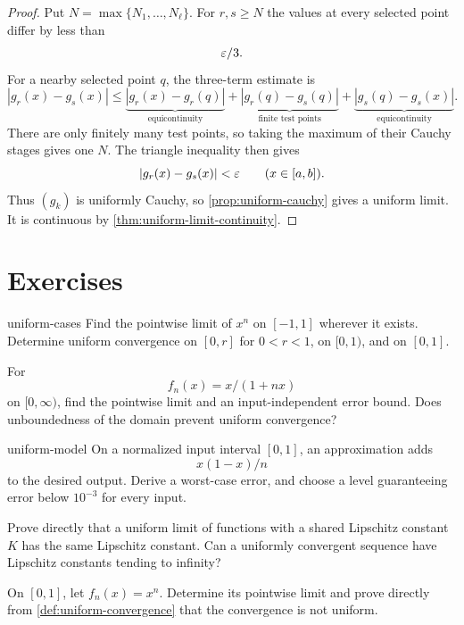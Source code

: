 \begin{proof}
Put $N=\max\{N_1,\ldots,N_\ell\}$. For $r,s\geq N$ the values
at every selected point differ by less than
\[
\varepsilon/3.
\]
  For a nearby selected point $q$, the
three-term estimate is
\[
|g_r(x)-g_s(x)|\leq
\underbrace{|g_r(x)-g_r(q)|}_{\text{equicontinuity}}
+\underbrace{|g_r(q)-g_s(q)|}_{\text{finite test points}}
+\underbrace{|g_s(q)-g_s(x)|}_{\text{equicontinuity}}.
\]
There are only finitely many test points, so taking the maximum of their
Cauchy stages gives one $N$. The triangle inequality then gives
\[
\lvert g_r(x)-g_s(x)\rvert<\varepsilon
\qquad(x\in[a,b]).
\]
Thus $(g_k)$ is uniformly Cauchy, so \cref{prop:uniform-cauchy} gives a
uniform limit.  It is continuous by \cref{thm:uniform-limit-continuity}.
\end{proof}



\section*{Exercises}

\begin{hexercise}{uniform-cases}
Find the pointwise limit of $x^n$ on $[-1,1]$ wherever it exists. Determine uniform convergence on $[0,r]$ for $0<r<1$, on $[0,1)$, and on $[0,1]$.
\end{hexercise}

\begin{exercise}
For
\[
f_n(x)=x/(1+nx)
\]
 on $[0,\infty)$, find the pointwise limit and an input-independent error bound. Does unboundedness of the domain prevent uniform convergence?
\end{exercise}

\begin{hexercise}{uniform-model}
On a normalized input interval $[0,1]$, an approximation adds
\[
x(1-x)/n
\]
 to the desired output. Derive a worst-case error, and choose a level guaranteeing error below $10^{-3}$ for every input.
\end{hexercise}

\begin{exercise}
Prove directly that a uniform limit of functions with a shared Lipschitz constant $K$ has the same Lipschitz constant. Can a uniformly convergent sequence have Lipschitz constants tending to infinity?
\end{exercise}

\begin{exercise}
On $[0,1]$, let $f_n(x)=x^n$.
Determine its pointwise limit and prove directly from \cref{def:uniform-convergence} that the convergence is not uniform.
\end{exercise}

